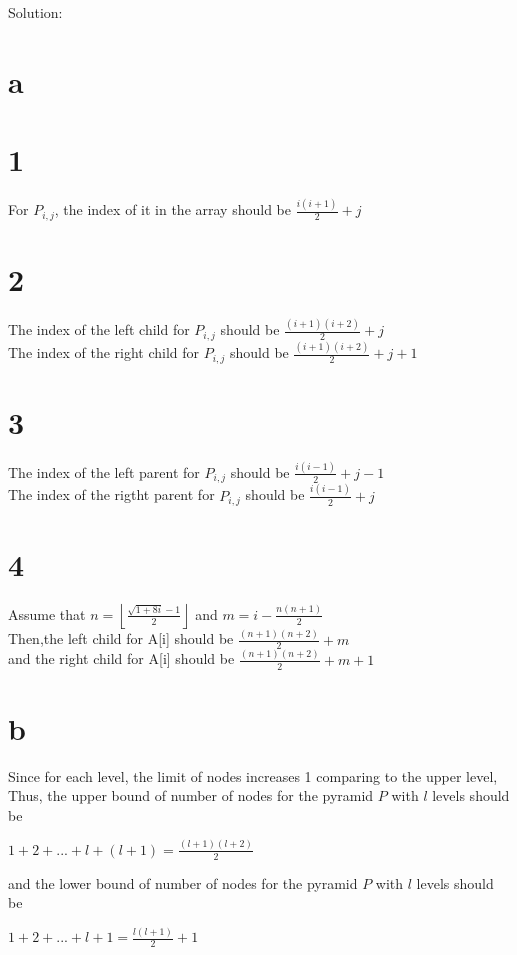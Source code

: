 \documentclass[12pt]{article}
\newcommand{\floor}[1]{\left\lfloor #1 \right\rfloor}
\begin{document}
	Solution:
	\begin{itemize}
		\part{a}
		\begin{itemize}
			\part{1}
			For $P_{i,j}$, the index of it in the array should be $\frac{i(i+1)}{2}+j$
			\part{2}
			The index of the left child for $P_{i,j}$ should be $\frac{(i+1)(i+2)}{2}+j$\\
			The index of the right child for $P_{i,j}$ should be $\frac{(i+1)(i+2)}{2}+j+1$
			\part{3}
			The index of the left parent for $P_{i,j}$ should be $\frac{i(i-1)}{2}+j-1$\\
			The index of the rigtht parent for $P_{i,j}$  should be $\frac{i(i-1)}{2}+j$
			\part{4}
			Assume that $n=\floor{\frac{\sqrt{1+8i}-1}{2}}$ and $m=i-\frac{n(n+1)}{2}$\\
			Then,the left child for A[i] should be $\frac{(n+1)(n+2)}{2}+m$\\
			and the right child for A[i] should be $\frac{(n+1)(n+2)}{2}+m+1$
		\end{itemize}
		
		\part{b}
		Since for each level, the limit of nodes increases 1 comparing to the upper level,\\
		Thus, the upper bound of number of nodes for the pyramid $P$ with $l$ levels should be
		\begin{center}
			$1+2+...+l+(l+1)=\frac{(l+1)(l+2)}{2}$
		\end{center} 
		and the lower bound of number of nodes for the pyramid $P$ with $l$ levels should be
		\begin{center}
			$1+2+...+l+1=\frac{l(l+1)}{2}+1$
		\end{center}
		

\end{itemize}
\end{document}
